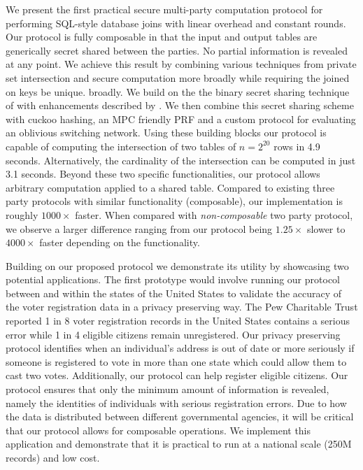 We present the first practical secure multi-party computation protocol for performing SQL-style database joins with linear overhead and constant rounds. Our protocol is fully composable in that the input and output tables are generically secret shared between the parties. 
\iffullversion
	No partial information is revealed at any point. 
\fi
	We achieve this result by combining various techniques from private set intersection and secure computation more 
\iffullversion 
	broadly while requiring the joined on keys be unique.
\else
	broadly.
\fi
 We build on the the binary secret sharing technique of \cite{highthroughput} with enhancements described by \cite{aby3}. We then combine this secret sharing scheme with cuckoo hashing\cite{usenix:PSZ14}, an MPC friendly PRF\cite{lowmc} and a custom protocol for evaluating an oblivious switching network\cite{MS13}. Using these building blocks our protocol is capable of computing the intersection of two tables of $n=2^{20}$ rows in 4.9 seconds. 
\iffullversion 
	Alternatively, the cardinality of the intersection can be computed in just 3.1 seconds.
\fi
  Beyond these two specific functionalities, our protocol allows arbitrary computation applied to a shared table. Compared to existing three party protocols with similar functionality (composable), our implementation is roughly $1000\times$ faster. When compared with \emph{non-composable} two party protocol, we observe a larger difference ranging from our protocol being $1.25\times$ slower to $4000\times$ faster depending on the functionality. 


Building on our proposed protocol we demonstrate its utility by showcasing two potential applications. The first prototype would involve running our protocol between and within the states of the United States to validate the accuracy of the voter registration data in a privacy preserving way. The Pew Charitable Trust\cite{pew} reported 1 in 8 voter registration records in the United States contains a serious error while 1 in 4 eligible citizens remain unregistered. Our privacy preserving protocol identifies when an individual's address is out of date or more seriously if someone is registered to vote in more than one state which could allow them to cast two votes. 
\iffullversion
Additionally, our protocol can help register eligible citizens. Our protocol ensures that only the minimum amount of information is revealed, namely the identities of individuals with serious registration errors.
\fi 
Due to how the data is distributed between different governmental agencies, it will be critical that our protocol allows for composable operations. We implement this application and demonstrate that it is practical to run at a national scale (250M records) and low cost.

